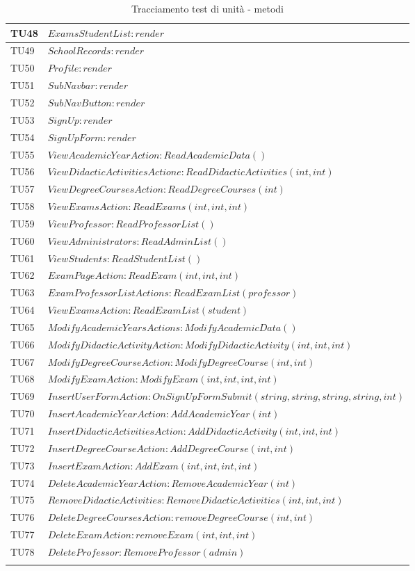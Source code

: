 \begin{longtable}{|>{\centering\arraybackslash}p{2cm}| p{15cm}|}
	\hline
	TU48 & $ExamsStudentList:render$\\
	\hline
	TU49 & $SchoolRecords:render$\\
	\hline
	TU50 & $Profile:render$\\
	\hline
	TU51 & $SubNavbar:render$\\
	\hline
	TU52 & $SubNavButton:render$\\
	\hline
	TU53 & $SignUp:render$\\
	\hline
	TU54 & $SignUpForm:render$\\
	\hline
	TU55 & $ViewAcademicYearAction:ReadAcademicData()$\\
	\hline
	TU56 & $ViewDidacticActivitiesActione:ReadDidacticActivities(int,int)$\\
	\hline
	TU57 & $ViewDegreeCoursesAction:ReadDegreeCourses(int)$\\
	\hline
	TU58 & $ViewExamsAction:ReadExams(int,int,int)$\\
	\hline
	TU59 & $ViewProfessor:ReadProfessorList()$\\
	\hline
	TU60 & $ViewAdministrators:ReadAdminList()$\\
	\hline
	TU61 & $ViewStudents:ReadStudentList()$\\
	\hline
	TU62 & $ExamPageAction:ReadExam(int,int,int)$\\
	\hline
	TU63 & $ExamProfessorListActions:ReadExamList(professor)$\\
	\hline
	TU64 & $ViewExamsAction:ReadExamList(student)$\\
	\hline
	TU65 & $ModifyAcademicYearsActions:ModifyAcademicData()$\\
	\hline
	TU66 & $ModifyDidacticActivityAction:ModifyDidacticActivity(int,int,int)$\\
	\hline
	TU67 & $ModifyDegreeCourseAction:ModifyDegreeCourse(int,int)$\\
	\hline
	TU68 & $ModifyExamAction:ModifyExam(int,int,int,int)$\\
	\hline
	TU69 & $InsertUserFormAction:OnSignUpFormSubmit(string,string,string,string,int)$\\
	\hline
	TU70 & $InsertAcademicYearAction:AddAcademicYear(int)$\\
	\hline
	TU71 & $InsertDidacticActivitiesAction:AddDidacticActivity(int,int,int)$\\
	\hline
	TU72 & $InsertDegreeCourseAction:AddDegreeCourse(int,int)$\\
	\hline
	TU73 & $InsertExamAction:AddExam(int,int,int,int)$\\
	\hline
	TU74 & $DeleteAcademicYearAction:RemoveAcademicYear(int)$\\
	\hline
	TU75 & $RemoveDidacticActivities:RemoveDidacticActivities(int,int,int)$\\
	\hline
	TU76 & $DeleteDegreeCoursesAction:removeDegreeCourse(int,int)$\\
	\hline
	TU77 & $DeleteExamAction:removeExam(int,int,int)$\\
	\hline
	TU78 & $DeleteProfessor:RemoveProfessor(admin)$\\
	\hline
\caption[Tracciamento test di unità - metodi]{Tracciamento test di unità - metodi}
\end{longtable}
\clearpage